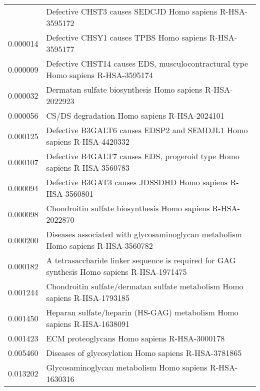 \begin{longtable}{p{2.4cm}p{14.5cm}}
\bottomrule
\endlastfoot
                 0.000027 &                                    Defective CHST3 causes SEDCJD Homo sapiens R-HSA-3595172 \\
                 0.000014 &                                      Defective CHSY1 causes TPBS Homo sapiens R-HSA-3595177 \\
                 0.000009 &            Defective CHST14 causes EDS, musculocontractural type Homo sapiens R-HSA-3595174 \\
                 0.000032 &                                    Dermatan sulfate biosynthesis Homo sapiens R-HSA-2022923 \\
                 0.000056 &                                                CS/DS degradation Homo sapiens R-HSA-2024101 \\
                 0.000125 &                       Defective B3GALT6 causes EDSP2 and SEMDJL1 Homo sapiens R-HSA-4420332 \\
                 0.000107 &                     Defective B4GALT7 causes EDS, progeroid type Homo sapiens R-HSA-3560783 \\
                 0.000094 &                                  Defective B3GAT3 causes JDSSDHD Homo sapiens R-HSA-3560801 \\
                 0.000098 &                                 Chondroitin sulfate biosynthesis Homo sapiens R-HSA-2022870 \\
                 0.000200 &            Diseases associated with glycosaminoglycan metabolism Homo sapiens R-HSA-3560782 \\
                 0.000182 &  A tetrasaccharide linker sequence is required for GAG synthesis Homo sapiens R-HSA-1971475 \\
                 0.001244 &                  Chondroitin sulfate/dermatan sulfate metabolism Homo sapiens R-HSA-1793185 \\
                 0.001450 &                      Heparan sulfate/heparin (HS-GAG) metabolism Homo sapiens R-HSA-1638091 \\
                 0.001423 &                                                ECM proteoglycans Homo sapiens R-HSA-3000178 \\
                 0.005460 &                                        Diseases of glycosylation Homo sapiens R-HSA-3781865 \\
                 0.013202 &                                     Glycosaminoglycan metabolism Homo sapiens R-HSA-1630316 \\
\end{longtable}


